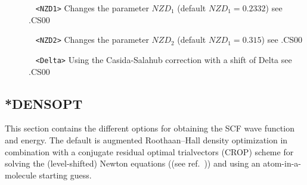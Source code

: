 \begin{description}
\item[] \verb| | \newline
\verb|<NZD1>|\newline
Changes the parameter $NZD_{1}$ (default $NZD_{1} = 0.2332$) see .CS00
\item[] \verb| | \newline
\verb|<NZD2>|\newline
Changes the parameter $NZD_{2}$ (default $NZD_{1} = 0.315$) see .CS00
\item[] \verb| | \newline
\verb|<Delta>|\newline
Using the Casida-Salahub correction with a shift of Delta see .CS00
\end{description}

\subsection{*DENSOPT}\label{subsec:densopt}
This section contains the different options for obtaining the SCF wave function
and energy. The default is augmented Roothaan--Hall density optimization  in combination with
a conjugate residual optimal trialvectors (CROP) scheme for solving the (level-shifted) Newton equations ((see ref.~\cite{crop})) and using an
atom-in-a-molecule  starting guess. 

